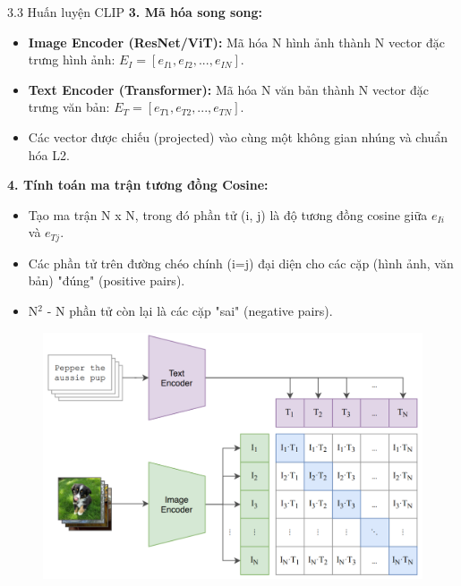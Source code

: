 \begin{frame}{3.3 Huấn luyện CLIP}
    \textbf{3. Mã hóa song song:}
    \begin{itemize}
        \item \textbf{Image Encoder (ResNet/ViT):} Mã hóa N hình ảnh thành N vector đặc trưng hình ảnh: $E_I = [e_{I1}, e_{I2}, ..., e_{IN}]$.
        \item \textbf{Text Encoder (Transformer):} Mã hóa N văn bản thành N vector đặc trưng văn bản: $E_T = [e_{T1}, e_{T2}, ..., e_{TN}]$.
        \item Các vector được chiếu (projected) vào cùng một không gian nhúng và chuẩn hóa L2.
    \end{itemize}
    \bigskip

    \textbf{4. Tính toán ma trận tương đồng Cosine:}
    \begin{itemize}
        \item Tạo ma trận N x N, trong đó phần tử (i, j) là độ tương đồng cosine giữa $e_{Ii}$ và $e_{Tj}$.
        \item Các phần tử trên đường chéo chính (i=j) đại diện cho các cặp (hình ảnh, văn bản) "đúng" (positive pairs).
        \item N$^2$ - N phần tử còn lại là các cặp "sai" (negative pairs).
    \end{itemize}
\end{frame}

\begin{frame}{}
    \begin{figure}
        \centering
        \includegraphics[width=0.8\linewidth]{img/01-similarity_matrix.png}
    \end{figure}
\end{frame}

